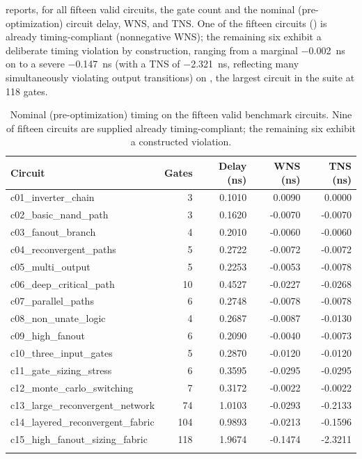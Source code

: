  reports, for all fifteen valid circuits, the gate
count and the nominal (pre-optimization) circuit delay, WNS, and TNS. One of the fifteen circuits () is already timing-compliant
(nonnegative WNS); the remaining six exhibit a deliberate timing violation
by construction, ranging from a marginal \SI{-0.002}{ns} on
 to a severe \SI{-0.147}{ns} (with a TNS
of \SI{-2.321}{ns}, reflecting many simultaneously violating output
transitions) on , the largest
circuit in the suite at 118 gates.

\newpage
\begin{longtable}{@{}lrrrr@{}}
\toprule
\textbf{Circuit} & \textbf{Gates} & \textbf{Delay (ns)} & \textbf{WNS (ns)} & \textbf{TNS (ns)} \\
\midrule
\endhead
c01\_inverter\_chain            & 3   & 0.1010 & \phantom{-}0.0090 & \phantom{-}0.0000 \\
c02\_basic\_nand\_path          & 3   & 0.1620 & -0.0070 & -0.0070 \\
c03\_fanout\_branch             & 4   & 0.2010 & -0.0060 & -0.0060 \\
c04\_reconvergent\_paths        & 5   & 0.2722 & -0.0072 & -0.0072 \\
c05\_multi\_output              & 5   & 0.2253 & -0.0053 & -0.0078 \\
c06\_deep\_critical\_path       & 10  & 0.4527 & -0.0227 & -0.0268 \\
c07\_parallel\_paths            & 6   & 0.2748 & -0.0078 & -0.0078 \\
c08\_non\_unate\_logic          & 4   & 0.2687 & -0.0087 & -0.0130 \\
c09\_high\_fanout               & 6   & 0.2090 & -0.0040 & -0.0073 \\
c10\_three\_input\_gates        & 5   & 0.2870 & -0.0120 & -0.0120 \\
c11\_gate\_sizing\_stress       & 6   & 0.3595 & -0.0295 & -0.0295 \\
c12\_monte\_carlo\_switching    & 7   & 0.3172 & -0.0022 & -0.0022 \\
c13\_large\_reconvergent\_network & 74  & 1.0103 & -0.0293 & -0.2133 \\
c14\_layered\_reconvergent\_fabric & 104 & 0.9893 & -0.0213 & -0.1596 \\
c15\_high\_fanout\_sizing\_fabric & 118 & 1.9674 & -0.1474 & -2.3211 \\
\bottomrule
\caption{Nominal (pre-optimization) timing on the fifteen valid benchmark
circuits. Nine of fifteen circuits are supplied already timing-compliant;
the remaining six exhibit a constructed violation.}
\label{tab:res-nominal}
\end{longtable}

